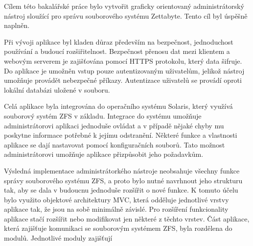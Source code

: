 Cílem této bakalářské práce bylo vytvořit graficky orientovaný administrátorský nástroj sloužící pro správu souborového systému Zettabyte. Tento cíl byl úspěšně naplněn.

Při vývoji aplikace byl kladen důraz především na bezpečnost, jednoduchost používání a budoucí rozšiřitelnost. Bezpečnost přenosu dat mezi klientem a webovým serverem je zajišťována pomocí HTTPS protokolu, který data šifruje. Do aplikace je umožněn vstup pouze autentizovaným uživatelům, jelikož nástroj umožňuje provádět nebezpečné příkazy. Autentizace uživatelů se provádí oproti lokální databázi uložené v souboru.

Celá aplikace byla integrována do operačního systému Solaris, který využívá souborový systém ZFS v základu. Integrace do systému umožňuje administrátorovi aplikaci jednoduše ovládat a v případě nějaké chyby mu poskytne informace potřebné k jejímu odstranění. Některé funkce a vlastnosti aplikace se dají nastavovat pomocí konfiguračních souborů. Tato možnost administrátorovi umožňuje aplikace přizpůsobit jeho požadavkům. 

Výsledná implementace administrátorkého nástroje neobsahuje všechny funkce správy souborového systému ZFS, a proto bylo nutné navrhnout jeho strukturu tak, aby se dala v budoucnu jednoduše rozšířit o nové funkce. K tomuto účelu bylo využito objektové architektury MVC, která odděluje jednotlivé vrstvy aplikace tak, že jsou na sobě minimálně závislé. Pro rozšíření funkcionality aplikace stačí rozšířit nebo modifikovat jen některé z těchto vrstev. Část aplikace, která zajišťuje komunikaci se souborovým systémem ZFS, byla rozdělena do modulů. Jednotlivé moduly zajišťují 
